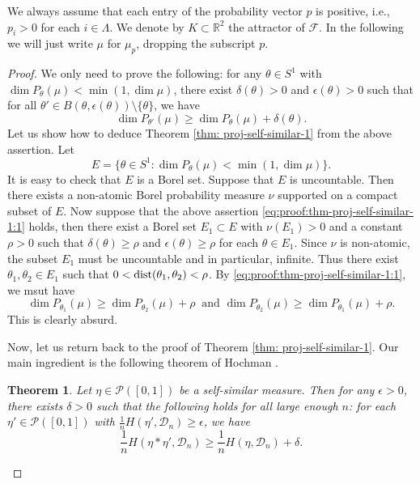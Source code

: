 \documentclass[a4paper,11pt]{amsart}
\newtheorem{theorem}{Theorem}[section]
\theoremstyle{definition}
\numberwithin{equation}{section}
\def\D{\mathcal{D}}
\def\cP{\mathcal P}
\def\R{\mathbb R}
\DeclareMathOperator{\dist}{{\rm dist}}
\begin{document}
We always assume that each entry of the probability vector $p$ is positive,  i.e., $p_i>0$ for each $i\in \Lambda$.  We denote by $K\subset \R^2$ the attractor of $\mathcal{F}$.  In the following we will just write $\mu$ for $\mu_p$, dropping the subscript  $p$.
 \begin{proof}
We only need to prove the following: for any $\theta\in S^1$ with $\dim P_\theta(\mu)<\min(1,\dim \mu)$, there exist $\delta(\theta)>0$ and $\epsilon(\theta)>0$ such that for all $\theta'\in B(\theta,\epsilon(\theta))\setminus \{\theta\}$, we have
\begin{equation}\label{eq:proof:thm-proj-self-similar-1:1}
\dim P_{\theta'}(\mu)\ge \dim P_\theta(\mu)+\delta(\theta).
\end{equation}
Let us show how to deduce Theorem \ref{thm: proj-self-similar-1} from the above assertion.  Let 
\[
E=\{\theta\in S^1: \dim P_\theta(\mu)<\min(1,\dim\mu)\}.
\]
It is easy to check that $E$ is a Borel set.  Suppose that $E$ is uncountable.  Then there exists a non-atomic Borel probability measure $\nu$ supported on a compact subset of $E$.  Now suppose that the above assertion \eqref{eq:proof:thm-proj-self-similar-1:1} holds,  then  there exist a Borel set $E_1\subset E$ with $\nu(E_1)>0$ and a constant $\rho>0$ such that $\delta(\theta)\ge \rho$ and $\epsilon(\theta)\ge \rho$ for each  $\theta\in E_1$. Since $\nu$ is non-atomic,  the subset $E_1$ must be uncountable and in particular,  infinite.  Thus there exist $\theta_1,\theta_2\in E_1$ such that $0<\dist(\theta_1,\theta_2)<\rho$.  By \eqref{eq:proof:thm-proj-self-similar-1:1}, we msut have
\[
\dim P_{\theta_1}(\mu)\ge \dim P_{\theta_2}(\mu)+\rho \ \textrm{ and } \dim P_{\theta_2}(\mu)\ge \dim P_{\theta_1}(\mu)+\rho.
\]
This is  clearly absurd.

Now, let us return back to the proof of Theorem \ref{thm: proj-self-similar-1}.  Our main ingredient is the following theorem  of Hochman \cite[Theorem 5.1]{Hochman2014}.
\begin{theorem}\label{thm:Hochman-entropy-increase-self-similar-meas-1}
Let $\eta\in \cP([0,1])$ be a self-similar measure. Then for any $\epsilon>0$, there exists $\delta>0$ such that the following holds for all large enough $n$: for each $\eta'\in \cP([0,1])$ with $\frac{1}{n}H(\eta',\D_n)\ge \epsilon$, we have
\[
\frac{1}{n}H(\eta*\eta',\D_n)\ge \frac{1}{n}H(\eta,\D_n)+\delta.
\]
\end{theorem}



\end{proof}
\end{document}
